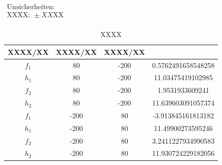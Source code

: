 \documentclass[11pt,a4paper]{article}
\begin{document}
\begin{table}[h]
\centering
\caption{XXXX} \vspace{11pt}
$\begin{array}{l}
\textrm{Unsicherheiten:}\\
\textrm{XXXX: } \pm XX \textrm{XX}\\
\end{array}$
\begin{tabular}{cccc}
\toprule
\textrm{XXXX}/\textrm{XX} & \textrm{XXXX}/\textrm{XX} & \textrm{XXXX}/\textrm{XX} \\
\midrule 
$f_1$ & 80 & -200 & 0.5762491658548258\\
$h_1$ & 80 & -200 & 11.03475419102985\\
$f_2$ & 80 & -200 & 1.9531933609241\\
$h_2$ & 80 & -200 & 11.639603091057374\\
$f_1$ & -200 & 80 & -3.913845161813182\\
$h_1$ & -200 & 80 & 11.49900273595246\\
$f_2$ & -200 & 80 & 3.2411227934990583\\
$h_2$ & -200 & 80 & 11.930724229182056\\
\bottomrule
\end{tabular}
\label{Tab:X}
\end{table}
\end{document}
